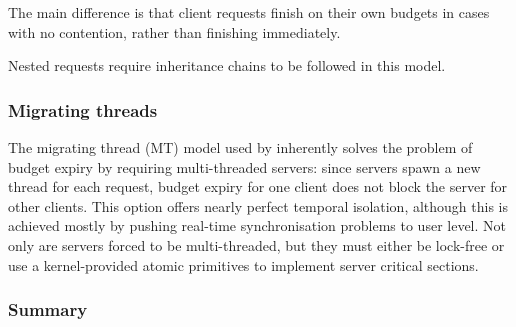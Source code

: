  The main difference is that client requests finish on their own budgets in cases with no contention, rather than finishing immediately.

 Nested requests require inheritance chains to be followed in this model.


\subsubsection{Migrating threads}

The migrating thread (MT) model used by \composite inherently solves the problem of budget expiry by requiring multi-threaded servers: since servers spawn a new thread for each request, budget expiry for one client does not block the server for other clients.
This option offers nearly perfect temporal isolation, although this is achieved mostly by pushing real-time synchronisation problems to user level.
Not only are servers forced to be multi-threaded, but they must either be lock-free or use a kernel-provided atomic primitives to implement server critical sections.

\subsubsection{Summary}


